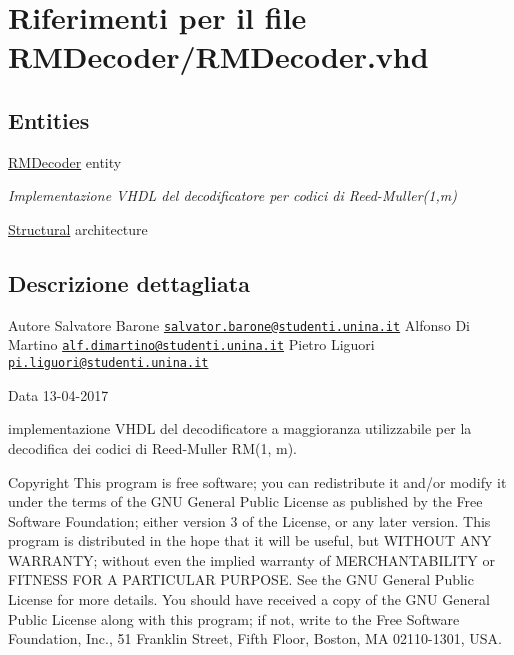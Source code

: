 \hypertarget{_r_m_decoder_8vhd}{\section{Riferimenti per il file R\+M\+Decoder/\+R\+M\+Decoder.vhd}
\label{_r_m_decoder_8vhd}
}
\subsection*{Entities}
\begin{DoxyCompactItemize}
\item 
\hyperlink{class_r_m_decoder}{R\+M\+Decoder} entity
\begin{DoxyCompactList}\small\item\em Implementazione V\+H\+D\+L del decodificatore per codici di Reed-\/\+Muller(1,m) \end{DoxyCompactList}\item 
\hyperlink{class_r_m_decoder_1_1_structural}{Structural} architecture
\end{DoxyCompactItemize}


\subsection{Descrizione dettagliata}
\begin{DoxyAuthor}{Autore}
Salvatore Barone \href{mailto:salvator.barone@studenti.unina.it}{\tt salvator.\+barone@studenti.\+unina.\+it} Alfonso Di Martino \href{mailto:alf.dimartino@studenti.unina.it}{\tt alf.\+dimartino@studenti.\+unina.\+it} Pietro Liguori \href{mailto:pi.liguori@studenti.unina.it}{\tt pi.\+liguori@studenti.\+unina.\+it} 
\end{DoxyAuthor}
\begin{DoxyDate}{Data}
13-\/04-\/2017
\begin{DoxyItemize}
\item implementazione V\+H\+D\+L del decodificatore a maggioranza utilizzabile per la decodifica dei codici di Reed-\/\+Muller R\+M(1, m). 
\end{DoxyItemize}
\end{DoxyDate}
\begin{DoxyCopyright}{Copyright}
This program is free software; you can redistribute it and/or modify it under the terms of the G\+N\+U General Public License as published by the Free Software Foundation; either version 3 of the License, or any later version. This program is distributed in the hope that it will be useful, but W\+I\+T\+H\+O\+U\+T A\+N\+Y W\+A\+R\+R\+A\+N\+T\+Y; without even the implied warranty of M\+E\+R\+C\+H\+A\+N\+T\+A\+B\+I\+L\+I\+T\+Y or F\+I\+T\+N\+E\+S\+S F\+O\+R A P\+A\+R\+T\+I\+C\+U\+L\+A\+R P\+U\+R\+P\+O\+S\+E. See the G\+N\+U General Public License for more details. You should have received a copy of the G\+N\+U General Public License along with this program; if not, write to the Free Software Foundation, Inc., 51 Franklin Street, Fifth Floor, Boston, M\+A 02110-\/1301, U\+S\+A. 
\end{DoxyCopyright}
